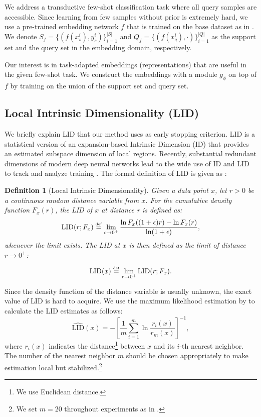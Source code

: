 \documentclass{article}
\newtheorem{definition}{Definition}
\begin{document}
We address a transductive few-shot classification task where all query samples are accessible.
Since learning from few samples without prior is extremely hard, we use a pre-trained embedding network $f$ that is trained on the base dataset as in \citet{LEO, SimpleShot, SIB, LaplacianShot}.
We denote $S_f=\{(f(x^i_s),y^i_s)\}_{i=1}^{|S|}$ and $Q_f=\{(f(x^i_q),\cdot)\}_{i=1}^{|Q|}$ as the support set and the query set in the embedding domain, respectively.

Our interest is in task-adapted embeddings (representations) that are useful in the given few-shot task.
We construct the embeddings with a module $g_\phi$ on top of $f$ by training on the union of the support set and query set.




\subsection{Local Intrinsic Dimensionality (LID)}
\label{subsection:LID}
We briefly explain LID that our method uses as early stopping criterion.
LID is a statistical version of an expansion-based Intrinsic Dimension (ID) that provides an estimated subspace dimension of local regions.
Recently, substantial redundant dimensions of modern deep neural networks lead to the wide use of ID and LID to track and analyze training \cite{Amsaleg17, Ma18a, Ma18b, Ansuini19, Gong19}.
The formal definition of LID is given as \cite{Amsaleg15, Houle17a, Houle17b}:
\begin{definition}[Local Intrinsic Dimensionality]
	Given a data point $x$, let $r>0$ be a continuous random distance variable from $x$. For the cumulative density function $F_x(r)$, the {\normalfont LID} of $x$ at distance r is defined as{\normalfont:}
	\begin{equation}
	\text{\normalfont LID}(r;F_x) \overset{\underset{\mathrm{def}}{}}{=} \lim_{\epsilon\rightarrow 0^{+}}\frac{\ln{F_x((1+\epsilon)r)} - \ln{F_x(r)}}{\ln(1+\epsilon)}, \end{equation}
	whenever the limit exists. The {\normalfont LID} at $x$ is then defined as the limit of distance $r\rightarrow 0^{+}${\normalfont:}
	\begin{equation}
	\text{\normalfont LID}(x) \overset{\underset{\mathrm{def}}{}}{=} \lim_{r\rightarrow 0^{+}} \text{\normalfont LID}(r;F_x).
	\end{equation} 
\end{definition}

Since the density function of the distance variable is usually unknown, the exact value of LID is hard to acquire.
We use the maximum likelihood estimation by \citet{Amsaleg15} to calculate the LID estimates as follows:
\begin{equation}
\widehat{\text{LID}}(x) = -\left[\frac{1}{m}\sum_{i=1}^m \ln\frac{r_i(x)}{r_m(x)}\right]^{-1},
\end{equation} 
where $r_i(x)$ indicates the distance\footnote{We use Euclidean distance.} between $x$ and its $i$-th nearest neighbor.
The number of the nearest neighbor $m$ should be chosen appropriately to make estimation local but stabilized.\footnote{We set $m=20$ throughout experiments as in \citet{Ma18a}.}
\end{document}
